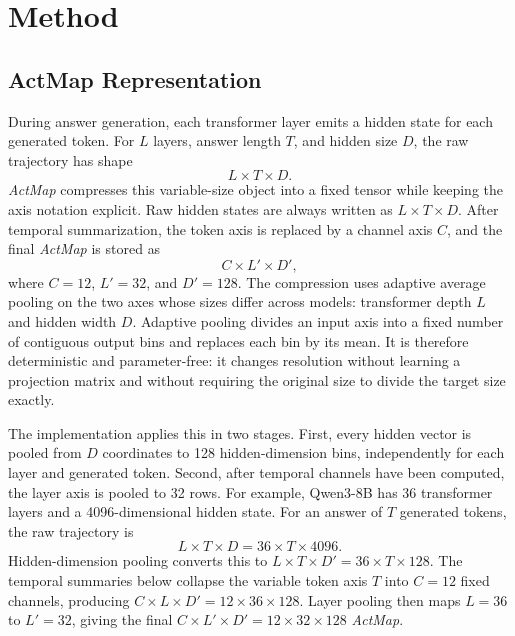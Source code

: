 \documentclass{article}
\newcommand{\actmap}{\textit{ActMap}}
\begin{document}
\section{Method}

\subsection{ActMap Representation}

During answer generation, each transformer layer emits a hidden state for each generated token. For \(L\) layers, answer length \(T\), and hidden size \(D\), the raw trajectory has shape
\[
    L \times T \times D .
\]
\actmap{} compresses this variable-size object into a fixed tensor while keeping the axis notation explicit. Raw hidden states are always written as \(L \times T \times D\). After temporal summarization, the token axis is replaced by a channel axis \(C\), and the final \actmap{} is stored as
\[
    C \times L' \times D',
\]
where \(C=12\), \(L'=32\), and \(D'=128\). The compression uses adaptive average pooling on the two axes whose sizes differ across models: transformer depth \(L\) and hidden width \(D\). Adaptive pooling divides an input axis into a fixed number of contiguous output bins and replaces each bin by its mean. It is therefore deterministic and parameter-free: it changes resolution without learning a projection matrix and without requiring the original size to divide the target size exactly.

The implementation applies this in two stages. First, every hidden vector is pooled from \(D\) coordinates to 128 hidden-dimension bins, independently for each layer and generated token. Second, after temporal channels have been computed, the layer axis is pooled to 32 rows. For example, Qwen3-8B has 36 transformer layers and a 4096-dimensional hidden state. For an answer of \(T\) generated tokens, the raw trajectory is
\[
    L \times T \times D = 36 \times T \times 4096 .
\]
Hidden-dimension pooling converts this to \(L \times T \times D' = 36 \times T \times 128\). The temporal summaries below collapse the variable token axis \(T\) into \(C=12\) fixed channels, producing \(C \times L \times D' = 12 \times 36 \times 128\). Layer pooling then maps \(L=36\) to \(L'=32\), giving the final \(C \times L' \times D' = 12 \times 32 \times 128\) \actmap{}.
\end{document}
